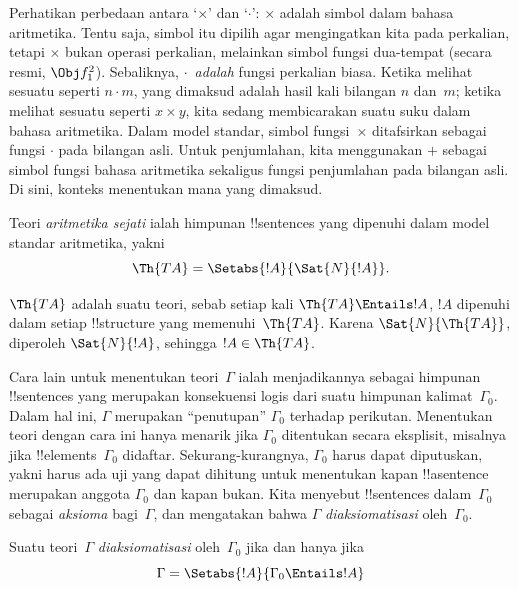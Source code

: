 \documentclass[../../../include/open-logic-section]{subfiles}
\begin{document}
Perhatikan perbedaan antara `$\times$' dan `$\cdot$': $\times$ adalah simbol
dalam bahasa aritmetika. Tentu saja, simbol itu dipilih agar mengingatkan kita
pada perkalian, tetapi $\times$ bukan operasi perkalian, melainkan simbol
fungsi dua-tempat (secara resmi, $\Obj f^2_1$). Sebaliknya,
$\cdot$~\emph{adalah} fungsi perkalian biasa. Ketika melihat sesuatu seperti
$n \cdot m$, yang dimaksud adalah hasil kali bilangan $n$ dan~$m$; ketika
melihat sesuatu seperti $x \times y$, kita sedang membicarakan suatu suku
dalam bahasa aritmetika. Dalam model standar, simbol fungsi~$\times$
ditafsirkan sebagai fungsi $\cdot$ pada bilangan asli. Untuk penjumlahan, kita
menggunakan $+$ sebagai simbol fungsi bahasa aritmetika sekaligus fungsi
penjumlahan pada bilangan asli. Di sini, konteks menentukan mana yang dimaksud.

\begin{defn}
Teori \emph{aritmetika sejati} ialah himpunan !!{sentence}s yang dipenuhi dalam
model standar aritmetika, yakni
\[
\Th{TA} = \Setabs{!A}{\Sat{N}{!A}}.
\]
\end{defn}

$\Th{TA}$ adalah suatu teori, sebab setiap kali $\Th{TA} \Entails !A$,
$!A$ dipenuhi dalam setiap !!{structure} yang memenuhi~$\Th{TA}$. Karena
$\Sat{N}{\Th{TA}}$, diperoleh $\Sat{N}{!A}$, sehingga $!A \in \Th{TA}$.

Cara lain untuk menentukan teori~$\Gamma$ ialah menjadikannya sebagai
himpunan !!{sentence}s yang merupakan konsekuensi logis dari suatu himpunan
kalimat~$\Gamma_0$.
Dalam hal ini, $\Gamma$ merupakan ``penutupan'' $\Gamma_0$ terhadap
perikutan. Menentukan teori dengan cara ini hanya menarik jika $\Gamma_0$
ditentukan secara eksplisit, misalnya jika !!{element}s~$\Gamma_0$ didaftar.
Sekurang-kurangnya, $\Gamma_0$ harus dapat diputuskan, yakni harus ada uji
yang dapat dihitung untuk menentukan kapan !!a{sentence} merupakan anggota
$\Gamma_0$ dan kapan bukan. Kita menyebut !!{sentence}s dalam~$\Gamma_0$
sebagai \emph{aksioma} bagi~$\Gamma$, dan mengatakan bahwa $\Gamma$
\emph{diaksiomatisasi} oleh~$\Gamma_0$.

\begin{defn}
Suatu teori~$\Gamma$ \emph{diaksiomatisasi} oleh~$\Gamma_0$ jika dan hanya
jika
\[
\Gamma = \Setabs{!A}{\Gamma_0 \Entails !A}
\]
\end{defn}
\end{document}
